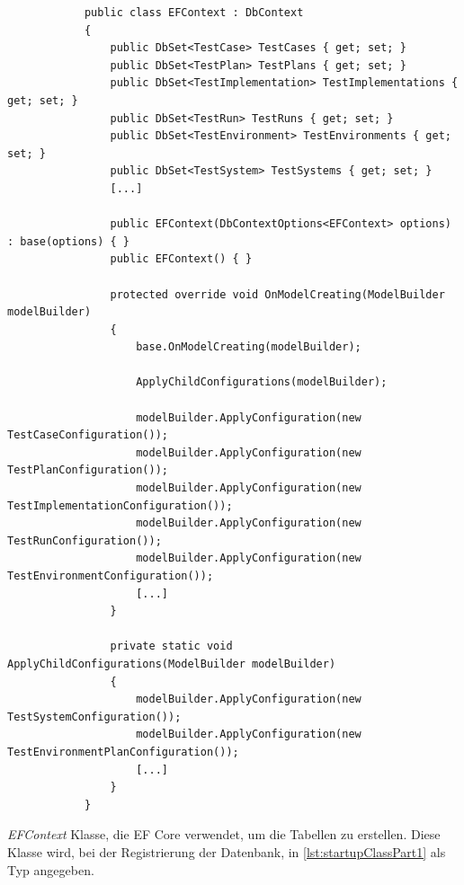 \documentclass[a4paper, fontsize=11pt, parskip=half, twoside]{scrreprt}
\begin{document}
	\begin{listing}[ht]
		\begin{verbatim}
			public class EFContext : DbContext
			{
				public DbSet<TestCase> TestCases { get; set; }
				public DbSet<TestPlan> TestPlans { get; set; }
				public DbSet<TestImplementation> TestImplementations { get; set; }
				public DbSet<TestRun> TestRuns { get; set; }
				public DbSet<TestEnvironment> TestEnvironments { get; set; }		
				public DbSet<TestSystem> TestSystems { get; set; }
				[...]
				
				public EFContext(DbContextOptions<EFContext> options) : base(options) { }	
				public EFContext() { }
				
				protected override void OnModelCreating(ModelBuilder modelBuilder)
				{
					base.OnModelCreating(modelBuilder);
					
					ApplyChildConfigurations(modelBuilder);
					
					modelBuilder.ApplyConfiguration(new TestCaseConfiguration());
					modelBuilder.ApplyConfiguration(new TestPlanConfiguration());
					modelBuilder.ApplyConfiguration(new TestImplementationConfiguration());
					modelBuilder.ApplyConfiguration(new TestRunConfiguration());
					modelBuilder.ApplyConfiguration(new TestEnvironmentConfiguration());
					[...]
				}
				
				private static void ApplyChildConfigurations(ModelBuilder modelBuilder)
				{
					modelBuilder.ApplyConfiguration(new TestSystemConfiguration());
					modelBuilder.ApplyConfiguration(new TestEnvironmentPlanConfiguration());
					[...]
				}
			}
		\end{verbatim}
		\caption{
			\emph{EFContext} Klasse, die \ac{EF} Core verwendet, um die Tabellen zu erstellen. 
			Diese Klasse wird, bei der Registrierung der Datenbank, in \autoref{lst:startupClassPart1} als Typ angegeben.
		}
		\label{lst:efcontextClass}
	\end{listing}
\end{document}
